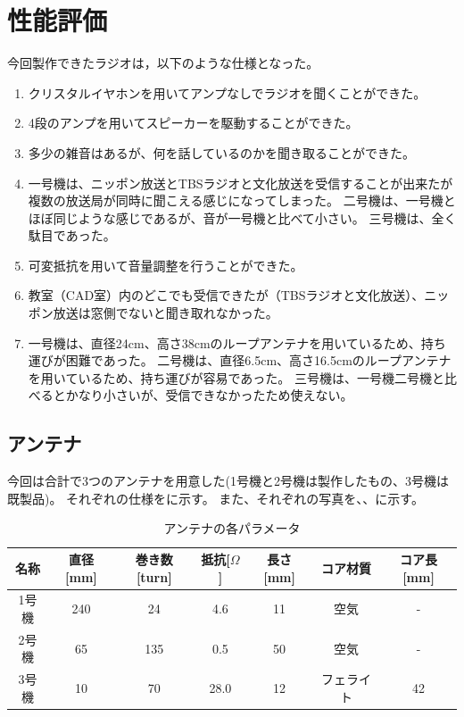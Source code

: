 \documentclass[report.tex]{subfiles}
\begin{document}
\section{性能評価}

今回製作できたラジオは，以下のような仕様となった。

\begin{enumerate}
	\item クリスタルイヤホンを用いてアンプなしでラジオを聞くことができた。
	\item 4段のアンプを用いてスピーカーを駆動することができた。
	\item 多少の雑音はあるが、何を話しているのかを聞き取ることができた。
	\item 一号機は、ニッポン放送とTBSラジオと文化放送を受信することが出来たが複数の放送局が同時に聞こえる感じになってしまった。
	      二号機は、一号機とほぼ同じような感じであるが、音が一号機と比べて小さい。
	      三号機は、全く駄目であった。
	\item 可変抵抗を用いて音量調整を行うことができた。
	\item 教室（CAD室）内のどこでも受信できたが（TBSラジオと文化放送）、ニッポン放送は窓側でないと聞き取れなかった。
	\item 一号機は、直径24cm、高さ38cmのループアンテナを用いているため、持ち運びが困難であった。
	      二号機は、直径6.5cm、高さ16.5cmのループアンテナを用いているため、持ち運びが容易であった。
	      三号機は、一号機二号機と比べるとかなり小さいが、受信できなかったため使えない。
\end{enumerate}

\subsection{アンテナ}

今回は合計で3つのアンテナを用意した(1号機と2号機は製作したもの、3号機は既製品)。
それぞれの仕様をに示す。
また、それぞれの写真を、、に示す。

\begin{table}[H]
	\centering
	\caption{アンテナの各パラメータ}
	\label{tab:ant}
	\begin{tabular}{ccccccc} \hline
		名称  & 直径[mm] & 巻き数[turn] & 抵抗[\(\Omega\)] & 長さ[mm] & コア材質  & コア長[mm] \\ \hline
		1号機 & 240    & 24        & 4.6            & 11     & 空気    & -       \\
		2号機 & 65     & 135       & 0.5            & 50     & 空気    & -       \\
		3号機 & 10     & 70        & 28.0           & 12     & フェライト & 42      \\ \hline
	\end{tabular}
\end{table}
\end{document}
